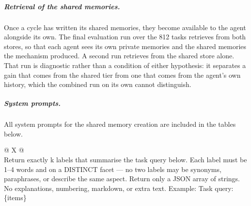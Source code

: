 \subparagraph{Retrieval of the shared memories.}
Once a cycle has written its shared memories, they become available to the agent alongside its own. The final evaluation run over the 812 tasks retrieves from both stores, so that each agent sees its own private memories and the shared memories the mechanism produced. A second run retrieves from the shared store alone. That run is diagnostic rather than a condition of either hypothesis: it separates a gain that comes from the shared tier from one that comes from the agent's own history, which the combined run on its own cannot distinguish.

\subparagraph{System prompts.} All system prompts for the shared memory creation are included in the tables below.

\begin{table}[htbp]
    \centering
    \caption{Step 1 - System prompt used by the Gemma model to generate the differentially private labels for each cycle.}
    \label{tab:label-prompt}
    \small
    \begin{tabularx}{\textwidth}{@{} X @{}}
        \toprule
         \\
        \midrule
        Return exactly {k} labels that summarise the task query below. Each label must be 1–4 words and on a DISTINCT facet — no two labels may be synonyms, paraphrases, or describe the same aspect. Return only a JSON array of strings.
        No explanations, numbering, markdown, or extra text.\newline
        \newline
        Example:\newline
        \newline
        Task query:\newline
        \{items\}
        \bottomrule
    \end{tabularx}
\end{table}

